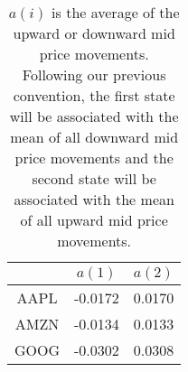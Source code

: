 \begin{table}[htpb]

\centering
\begin{tabular}{c|c|c}
     &  $a(1)$ & $a(2)$\\
\hline
AAPL & -0.0172 & 0.0170\\
\hline
AMZN & -0.0134 & 0.0133\\
\hline
GOOG & -0.0302 & 0.0308\\
\end{tabular}

\caption{\label{table:2sdoticks} $a(i)$ is the average of the upward or downward mid price movements. Following our previous convention, the first state will be associated with the mean of all downward mid price movements and the second state will be associated with the mean of all upward mid price movements.}
\end{table}